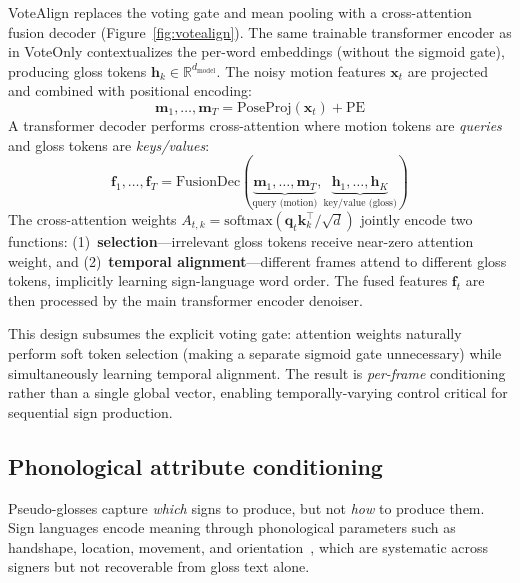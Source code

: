 \documentclass{article}
\begin{document}
VoteAlign replaces the voting gate and mean pooling with a cross-attention fusion decoder (Figure~\ref{fig:votealign}).
The same trainable transformer encoder as in VoteOnly contextualizes the per-word embeddings (without the sigmoid gate), producing gloss tokens $\mathbf{h}_k \in \mathbb{R}^{d_\text{model}}$.
The noisy motion features $\mathbf{x}_t$ are projected and combined with positional encoding:
\begin{equation}
    \mathbf{m}_1, \ldots, \mathbf{m}_T = \text{PoseProj}(\mathbf{x}_t) + \text{PE}
\end{equation}
A transformer decoder performs cross-attention where motion tokens are \emph{queries} and gloss tokens are \emph{keys/values}:
\begin{equation}
    \mathbf{f}_1, \ldots, \mathbf{f}_T = \text{FusionDec}(\underbrace{\mathbf{m}_1, \ldots, \mathbf{m}_T}_{\text{query (motion)}}, \underbrace{\mathbf{h}_1, \ldots, \mathbf{h}_K}_{\text{key/value (gloss)}})
\end{equation}
The cross-attention weights $A_{t,k} = \text{softmax}(\mathbf{q}_t \mathbf{k}_k^\top / \sqrt{d})$ jointly encode two functions:
(1)~\textbf{selection}---irrelevant gloss tokens receive near-zero attention weight, and
(2)~\textbf{temporal alignment}---different frames attend to different gloss tokens, implicitly learning sign-language word order.
The fused features $\mathbf{f}_t$ are then processed by the main transformer encoder denoiser.

This design subsumes the explicit voting gate: attention weights naturally perform soft token selection (making a separate sigmoid gate unnecessary) while simultaneously learning temporal alignment.
The result is \emph{per-frame} conditioning rather than a single global vector, enabling temporally-varying control critical for sequential sign production.

\subsection{Phonological attribute conditioning}
\label{sec:phonology}

Pseudo-glosses capture \emph{which} signs to produce, but not \emph{how} to produce them.
Sign languages encode meaning through phonological parameters such as handshape, location, movement, and orientation~\citep{stokoe1960sign,brentari1998prosodic}, which are systematic across signers but not recoverable from gloss text alone.
\end{document}
